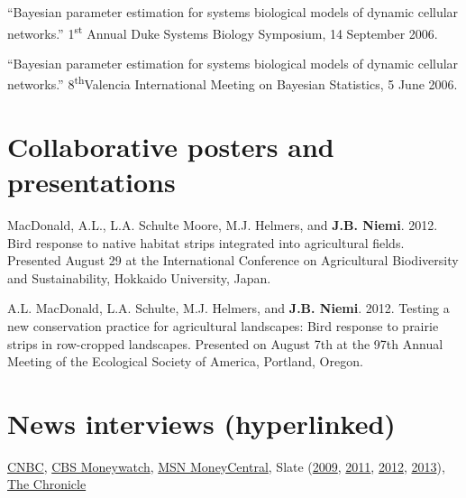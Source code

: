 \documentclass[overlapped,line,letterpaper]{res}
\begin{document}
\begin{resume}
{``Bayesian parameter estimation for systems biological models of dynamic cellular networks.'' 1\textsuperscript{st} Annual Duke Systems Biology Symposium, 14 September 2006.

``Bayesian parameter estimation for systems biological models of dynamic cellular networks.'' 8\textsuperscript{th}Valencia International Meeting on Bayesian Statistics, 5 June 2006.

}

\section{Collaborative posters and presentations}


MacDonald, A.L., L.A. Schulte Moore, M.J. Helmers, and {\bf J.B. Niemi}.  2012.  Bird response to native habitat strips integrated into agricultural fields.  Presented August 29 at the International Conference on Agricultural Biodiversity and Sustainability, Hokkaido University, Japan.  

A.L. MacDonald, L.A. Schulte, M.J. Helmers, and {\bf J.B. Niemi}.  2012.  Testing a new conservation practice for agricultural landscapes: Bird response to prairie strips in row-cropped landscapes.  Presented on August 7th at the 97th Annual Meeting of the Ecological Society of America, Portland, Oregon.

\section{\bf News interviews (hyperlinked)}

\href{http://www.nbcnews.com/business/slam-dunk-your-rivals-office-march-madness-pool-1C8912546}{CNBC}, %
\href{http://moneywatch.bnet.com/economic-news/article/ncaa-brackets-how-to-win-your-march-madness-pool/403055/?tag=main;related-link-0}{CBS Moneywatch}, 
\href{http://articles.moneycentral.msn.com/SmartSpending/blog/page.aspx?post=1704157}{MSN MoneyCentral}, 
Slate (\href{http://www.slate.com/id/2213974/pagenum/all/}{2009}, \href{http://www.slate.com/id/2288234/pagenum/all/}{2011}, 
\href{http://www.slate.com/articles/sports/sports_nut/2012/03/ncaa_basketball_tournament_bracket_act_like_a_hedge_fund_manager_and_pick_ohio_state_to_win_it_all_.single.html}{2012}, 
\href{http://www.slate.com/articles/sports/sports_nut/2012/03/ncaa_basketball_tournament_bracket_act_like_a_hedge_fund_manager_and_pick_ohio_state_to_win_it_all_.single.html}{2013}),
\href{http://dukechronicle.com/node/145805}{The Chronicle}





\end{resume}
\end{document}
